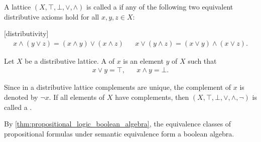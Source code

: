 \begin{definition}\label{def:distributive_lattice}\cite{nLab:distributive_lattice}
  A lattice \( (X, \top, \bot, \lor, \land) \) is called a  if any of the following two equivalent distributive axioms hold for all \( x, y, z \in X \):
  \begin{description}
    [distributivity]
    \begin{align*}
      x \land (y \lor z) = (x \land y) \lor (x \land z)
      &&
      x \lor (y \land z) = (x \lor y) \land (x \lor z).
    \end{align*}
  \end{description}
\end{definition}

\begin{definition}\label{def:boolean_algebra}\cite{nLab:boolean_algebra}
  Let \( X \) be a distributive lattice. A  of \( x \) is an element \( y \) of \( X \) such that
  \begin{align*}
    x \lor y = \top, && x \land y = \bot.
  \end{align*}

  Since in a distributive lattice complements are unique, the complement of \( x \) is denoted by \( \neg x \). If all elements of \( X \) have complements, then \( (X, \top, \bot, \lor, \land, \neg) \) is called a .
\end{definition}

\begin{example}\label{ex:boolean_algebra}
  By \cref{thm:propositional_logic_boolean_algebra}, the equivalence classes of propositional formulas under semantic equivalence form a boolean algebra.
\end{example}

